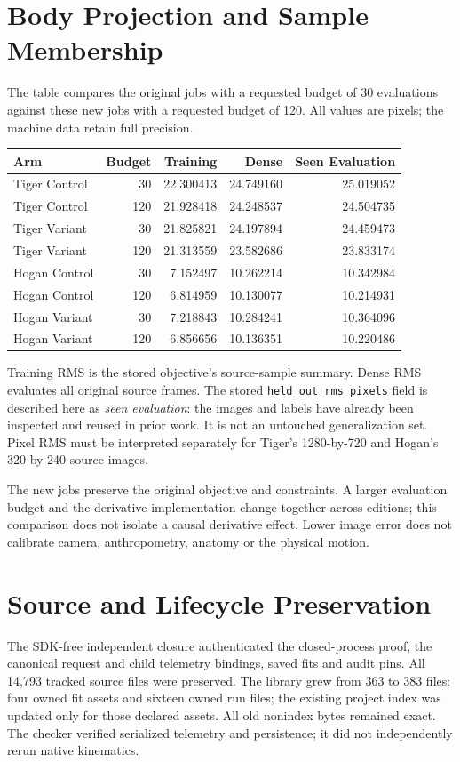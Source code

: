 \documentclass[11pt,letterpaper]{article}
\newcommand{\code}[1]{\nolinkurl{#1}}\newcommand{\hash}[1]{{\footnotesize\nolinkurl{#1}}}
\begin{document}
\section{Body Projection and Sample Membership}
The table compares the original jobs with a requested budget of 30 evaluations against these new jobs with a requested budget of 120. All values are pixels; the machine data retain full precision.
\begin{center}\small
\begin{tabular}{@{}lrrrr@{}}\toprule
Arm & Budget & Training & Dense & Seen Evaluation\\\midrule
Tiger Control & 30 & 22.300413 & 24.749160 & 25.019052\\
Tiger Control & 120 & 21.928418 & 24.248537 & 24.504735\\
Tiger Variant & 30 & 21.825821 & 24.197894 & 24.459473\\
Tiger Variant & 120 & 21.313559 & 23.582686 & 23.833174\\
Hogan Control & 30 & 7.152497 & 10.262214 & 10.342984\\
Hogan Control & 120 & 6.814959 & 10.130077 & 10.214931\\
Hogan Variant & 30 & 7.218843 & 10.284241 & 10.364096\\
Hogan Variant & 120 & 6.856656 & 10.136351 & 10.220486\\
\bottomrule\end{tabular}
\end{center}

Training RMS is the stored objective's source-sample summary. Dense RMS evaluates all original source frames. The stored \code{held_out_rms_pixels} field is described here as \emph{seen evaluation}: the images and labels have already been inspected and reused in prior work. It is not an untouched generalization set. Pixel RMS must be interpreted separately for Tiger's 1280-by-720 and Hogan's 320-by-240 source images.

The new jobs preserve the original objective and constraints. A larger evaluation budget and the derivative implementation change together across editions; this comparison does not isolate a causal derivative effect. Lower image error does not calibrate camera, anthropometry, anatomy or the physical motion.
\section{Source and Lifecycle Preservation}
The SDK-free independent closure authenticated the closed-process proof, the canonical request and child telemetry bindings, saved fits and audit pins. All 14,793 tracked source files were preserved. The library grew from 363 to 383 files: four owned fit assets and sixteen owned run files; the existing project index was updated only for those declared assets. All old nonindex bytes remained exact. The checker verified serialized telemetry and persistence; it did not independently rerun native kinematics.
\clearpage
\end{document}
